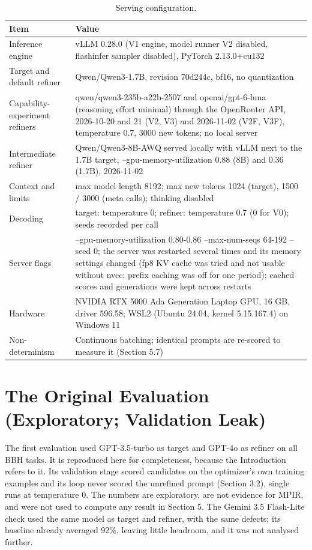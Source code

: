 \documentclass{ieeeaccess}
\begin{document}
\begin{table}[htbp]
\centering
\small
\caption{Serving configuration.}
\begin{tabular}{>{\raggedright\arraybackslash}p{}>{\raggedright\arraybackslash}p{}}
\toprule
\textbf{Item} & \textbf{Value} \\
\midrule
Inference engine & vLLM 0.28.0 (V1 engine, model runner V2 disabled, flashinfer sampler disabled), PyTorch 2.13.0+cu132 \\
Target and default refiner & Qwen/Qwen3-1.7B, revision 70d244c, bf16, no quantization \\
Capability-experiment refiners & qwen/qwen3-235b-a22b-2507 and openai/gpt-6-luna (reasoning effort minimal) through the OpenRouter API, 2026-10-20 and 21 (V2, V3) and 2026-11-02 (V2F, V3F), temperature 0.7, 3000 new tokens; no local server \\
Intermediate refiner & Qwen/Qwen3-8B-AWQ served locally with vLLM next to the 1.7B target, --gpu-memory-utilization 0.88 (8B) and 0.36 (1.7B), 2026-11-02 \\
Context and limits & max model length 8192; max new tokens 1024 (target), 1500 / 3000 (meta calls); thinking disabled \\
Decoding & target: temperature 0; refiner: temperature 0.7 (0 for V0); seeds recorded per call \\
Server flags & --gpu-memory-utilization 0.80-0.86 --max-num-seqs 64-192 --seed 0; the server was restarted several times and its memory settings changed (fp8 KV cache was tried and not usable without nvcc; prefix caching was off for one period); cached scores and generations were kept across restarts \\
Hardware & NVIDIA RTX 5000 Ada Generation Laptop GPU, 16 GB, driver 596.58; WSL2 (Ubuntu 24.04, kernel 5.15.167.4) on Windows 11 \\
Non-determinism & Continuous batching; identical prompts are re-scored to measure it (Section 5.7) \\
\bottomrule
\end{tabular}
\end{table}

\section{The Original Evaluation (Exploratory; Validation Leak)}

The first evaluation used GPT-3.5-turbo as target and GPT-4o as refiner on all BBH tasks. It is reproduced here for completeness, because the Introduction refers to it. Its validation stage scored candidates on the optimizer's own training examples and its loop never scored the unrefined prompt (Section 3.2), single runs at temperature 0. The numbers are exploratory, are not evidence for MPIR, and were not used to compute any result in Section 5. The Gemini 3.5 Flash-Lite check used the same model as target and refiner, with the same defects; its baseline already averaged 92\%, leaving little headroom, and it was not analysed further.
\end{document}

